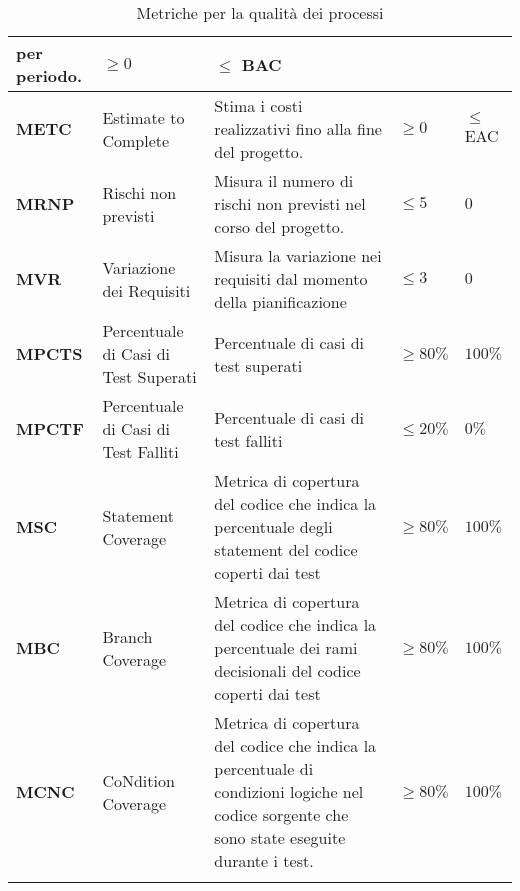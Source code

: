 \begin{longtable}{|C{1.5cm}|L{3cm}|L{4cm}|L{2.5cm}|L{2.5cm}|}
        per periodo. & $\geq 0  $ & $ \leq$ BAC  \\
        \hline
        \textbf{METC} & Estimate to Complete &  Stima i costi realizzativi fino alla fine del progetto. & $\geq 0  $ & $ \leq$ EAC \\
        \hline
        \textbf{MRNP}    & Rischi non previsti   & Misura il numero di rischi non previsti nel corso del progetto. & $\leq 5$ &   $0$ \\
        \hline
        \textbf{MVR} & Variazione dei Requisiti & Misura la variazione nei requisiti dal momento della pianificazione & $\leq 3$ & $0$\\
        \hline
        \textbf{MPCTS} & Percentuale di Casi di Test Superati & Percentuale di casi di test superati & $\geq 80\%$ & $100\%$ \\
        \hline
        \textbf{MPCTF} & Percentuale di Casi di Test Falliti & Percentuale di casi di test falliti & $\leq 20\%$ & $0\%$ \\
        \hline
        \textbf{MSC} & Statement Coverage & Metrica di copertura del codice che indica la percentuale degli statement del codice coperti dai test & $\geq 80\%$ & $100\%$ \\
        \hline
        \textbf{MBC} & Branch Coverage & Metrica di copertura del codice che indica la percentuale dei rami decisionali del codice coperti dai test & $\geq 80\%$ & $100\%$ \\
        \hline
        \textbf{MCNC} & CoNdition Coverage & Metrica di copertura del codice che indica la percentuale di condizioni logiche nel codice sorgente che sono state eseguite durante i test. & $\geq 80\%$ & $100\%$ \\
        \hline
        \caption{Metriche per la qualità dei processi}
        \label{tab:qualità_processo_progetto}
        \end{longtable}